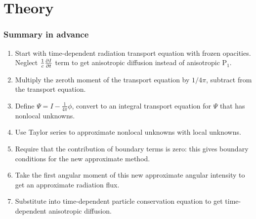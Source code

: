\documentclass[draft]{beamer}
\begin{document}
\section{Theory}
\begin{frame}
  \frametitle{Summary in advance}
  \begin{enumerate}
    \item Start with time-dependent radiation transport equation with frozen
      opacities. Neglect $\frac{1}{c}\frac{\partial I}{\partial t}$ term to get anisotropic
      diffusion instead of anisotropic P$_1$.
    \item Multiply the zeroth moment of the transport equation by $1/4\pi$,
      subtract from the transport equation.
    \item Define $\Psi=I - \frac1{4\pi} \phi$, convert to an integral transport
      equation for $\Psi$ that has nonlocal unknowns.
    \item Use Taylor series to approximate nonlocal unknowns with local
      unknowns.
    \item Require that the contribution of boundary terms is zero: this gives
      boundary conditions for the new approximate method.
    \item Take the first angular moment of this new approximate angular
      intensity to get an approximate radiation flux.
    \item Substitute into time-dependent particle conservation equation to get
      time-dependent anisotropic diffusion.
  \end{enumerate}
\end{frame}
\end{document}
